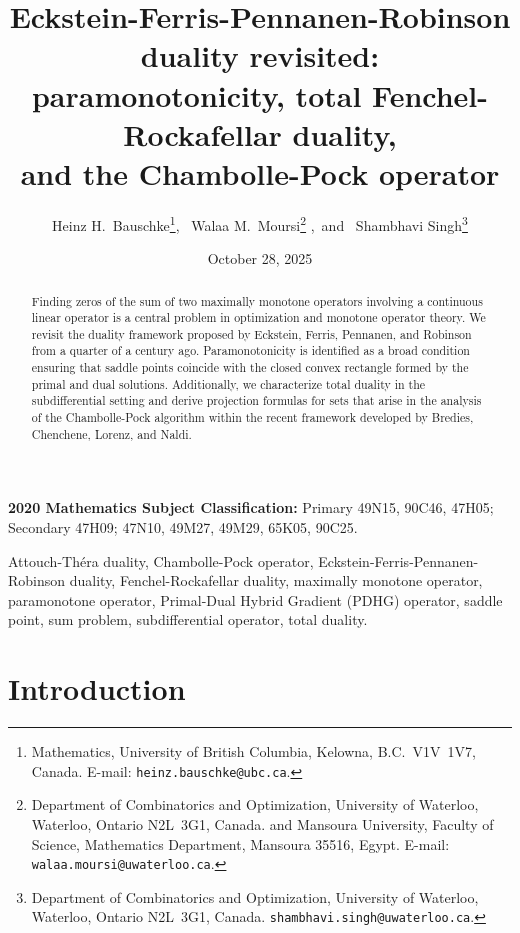 \documentclass{article}
\date{October 28, 2025}
\author{
Heinz H.\ Bauschke\thanks{
Mathematics, University
of British Columbia,
Kelowna, B.C.\ V1V~1V7, Canada. E-mail:
\texttt{heinz.bauschke@ubc.ca}.},~
Walaa M.\ Moursi\thanks{
Department of Combinatorics and Optimization, 
University of Waterloo,
Waterloo, Ontario N2L~3G1, Canada.
  and
  Mansoura University, Faculty of Science,
  Mathematics Department,
  Mansoura 35516, Egypt.
 E-mail: \texttt{walaa.moursi@uwaterloo.ca}.}
,~and~
Shambhavi Singh\thanks{
Department of Combinatorics and Optimization, 
University of Waterloo,
Waterloo, Ontario N2L~3G1, Canada.
\texttt{shambhavi.singh@uwaterloo.ca}.}
}
\title{\textsf{
Eckstein-Ferris-Pennanen-Robinson duality revisited:\\
paramonotonicity, total Fenchel-Rockafellar duality,\\
and the Chambolle-Pock operator
}
}
\begin{document}
\maketitle


\begin{abstract}
Finding zeros of the sum of two maximally monotone operators involving a continuous linear operator is a central problem in optimization and monotone operator theory. We revisit the duality framework proposed by Eckstein, Ferris, 
Pennanen, and Robinson from a quarter of a century ago. 
Paramonotonicity is identified as a broad condition ensuring that 
saddle points coincide with the closed convex rectangle formed by the 
primal and dual solutions. Additionally, we characterize total duality in 
the subdifferential setting and derive projection formulas for sets 
that arise in the analysis of the Chambolle-Pock algorithm within 
the recent framework developed by Bredies, Chenchene, Lorenz, and Naldi. 
\end{abstract}
{ 
\small
\noindent
{\bfseries 2020 Mathematics Subject Classification:}
{Primary 
49N15, %
90C46, %
47H05; %
Secondary 
47H09; %
47N10, %
49M27, %
49M29, %
65K05, %
90C25. %
}


Attouch-Th\'era duality, 
Chambolle-Pock operator,
Eckstein-Ferris-Pennanen-Robinson duality,
Fenchel-Rockafellar duality,
maximally monotone operator, 
paramonotone operator, 
Primal-Dual Hybrid Gradient (PDHG) operator, 
saddle point, 
sum problem, 
subdifferential operator, 
total duality. 

}


\section{Introduction} 
\end{document}
